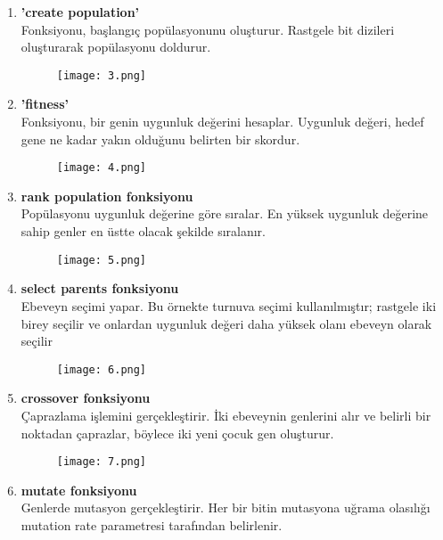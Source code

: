 \documentclass[12pt, a4paper]{article}
\begin{document}
\begin{flushleft}
\begin{enumerate}
	\item \textbf {'create population'} \\Fonksiyonu, başlangıç popülasyonunu oluşturur. Rastgele bit dizileri oluşturarak popülasyonu doldurur.\\[10pt]
	\begin{figure}[!h]
		\centering
		\texttt{[image: 3.png]}
		\\[20pt]
	\end{figure}
		\item \textbf {'fitness'} \\Fonksiyonu, bir genin uygunluk değerini hesaplar. Uygunluk değeri, hedef gene ne kadar yakın olduğunu belirten bir skordur.
	\begin{figure}[!h]
		\centering
		\texttt{[image: 4.png]}
		\\[20pt]
	\end{figure}
	\newpage
		\item \textbf{rank population fonksiyonu} \\Popülasyonu uygunluk değerine göre sıralar. En yüksek uygunluk değerine sahip genler en üstte olacak şekilde sıralanır.
	\begin{figure}[!h]
		\centering
		\texttt{[image: 5.png]}
		\\[20pt]
	\end{figure}
	\item \textbf{select parents fonksiyonu} \\
	Ebeveyn seçimi yapar. Bu örnekte turnuva seçimi kullanılmıştır; rastgele iki birey seçilir ve onlardan uygunluk değeri daha yüksek olanı ebeveyn olarak seçilir
	\begin{figure}[!h]
		\centering
		\texttt{[image: 6.png]}
		\\[20pt]
	\end{figure}
	\item \textbf{crossover fonksiyonu}\\ Çaprazlama işlemini gerçekleştirir. İki ebeveynin genlerini alır ve belirli bir noktadan çaprazlar, böylece iki yeni çocuk gen oluşturur.
	\begin{figure}[!h]
		\centering
		\texttt{[image: 7.png]}
		\\[20pt]
	\end{figure}
		\clearpage
	\item \textbf{mutate fonksiyonu}\\ Genlerde mutasyon gerçekleştirir. Her bir bitin mutasyona uğrama olasılığı mutation rate parametresi tarafından belirlenir.

\end{enumerate}
\end{flushleft}
\end{document}
